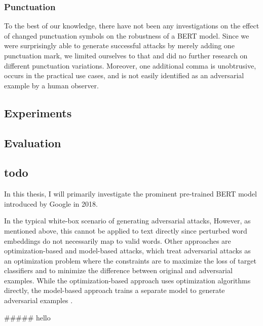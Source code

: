 \subsubsection{Punctuation}
To the best of our knowledge, there have not been any investigations on the effect of changed punctuation symbols on the robustness of a BERT model. Since we were surprisingly able to generate successful attacks by merely adding one punctuation mark, we limited ourselves to that and did no further research on different punctuation variations. Moreover, one additional comma is unobtrusive, occurs in the practical use cases, and is not easily identified as an adversarial example by a human observer.



\subsection{Experiments}

\subsection{Evaluation}

\subsection{todo}


 

In this thesis, I will primarily investigate the prominent pre-trained BERT model introduced by Google in 2018.



In the typical white-box scenario of generating adversarial attacks,  However, as mentioned above, this cannot be applied to text directly since perturbed word embeddings do not necessarily map to valid words. Other approaches are optimization-based and model-based attacks, which treat adversarial attacks as an optimization problem where the constraints are to maximize the loss of target classifiers and to minimize the difference between original and adversarial examples. While the optimization-based approach uses optimization algorithms directly, the model-based approach trains a separate model to generate adversarial examples \cite{xu2020elephant}.






##### hello






